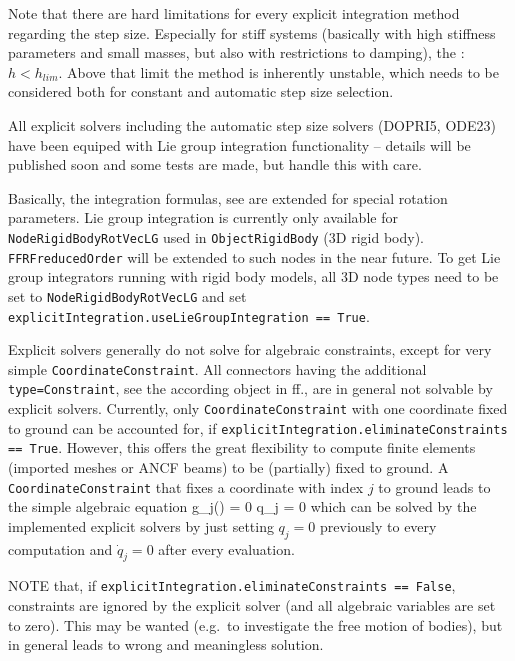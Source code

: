 Note that there are hard limitations for every explicit integration method regarding the step size. Especially for stiff systems (basically with high stiffness parameters and small masses, but also with restrictions to damping), the : $h < h_{lim}$. Above that limit the method is inherently unstable, which needs to be considered both for constant and automatic step size selection.

All explicit solvers including the automatic step size solvers (DOPRI5, ODE23) have been equiped with Lie group integration functionality -- details will be published soon and some tests are made, but handle this with care.

Basically, the integration formulas, see  are extended for special rotation parameters.
Lie group integration is currently only available for \texttt{NodeRigidBodyRotVecLG} used in \texttt{ObjectRigidBody} (3D rigid body). 
\texttt{FFRFreducedOrder} will be extended to such nodes in the near future.
To get Lie group integrators running with rigid body models, all 3D node types need to be set to \texttt{NodeRigidBodyRotVecLG} and 
set \texttt{explicitIntegration.useLieGroupIntegration == True}.

Explicit solvers generally do not solve for algebraic constraints, except for very simple \texttt{CoordinateConstraint}. 
All connectors having the additional \texttt{type=Constraint}, see the according object in ff., 
are in general not solvable by explicit solvers. 
Currently, only \texttt{CoordinateConstraint} with one coordinate fixed to ground can be accounted for, 
if \texttt{explicitIntegration.eliminateConstraints == True}. 
However, this offers the great flexibility to compute finite elements (imported meshes or ANCF beams) to be (partially) fixed to ground.
A \texttt{CoordinateConstraint} that fixes a coordinate with index $j$ to ground leads to the simple algebraic  equation
\be
  g_j(\qv) = 0 \quad \Leftrightarrow \quad  q_j = 0
\ee
which can be solved by the implemented explicit solvers by just setting $q_j = 0$ previously to every computation and $\dot q_j = 0$ after every  evaluation.

NOTE that, if \texttt{explicitIntegration.eliminateConstraints == False}, constraints are ignored by the explicit solver (and all algebraic variables are set to zero). This may be wanted (e.g.\ to investigate the free motion of bodies), but in general leads to wrong and meaningless solution.


